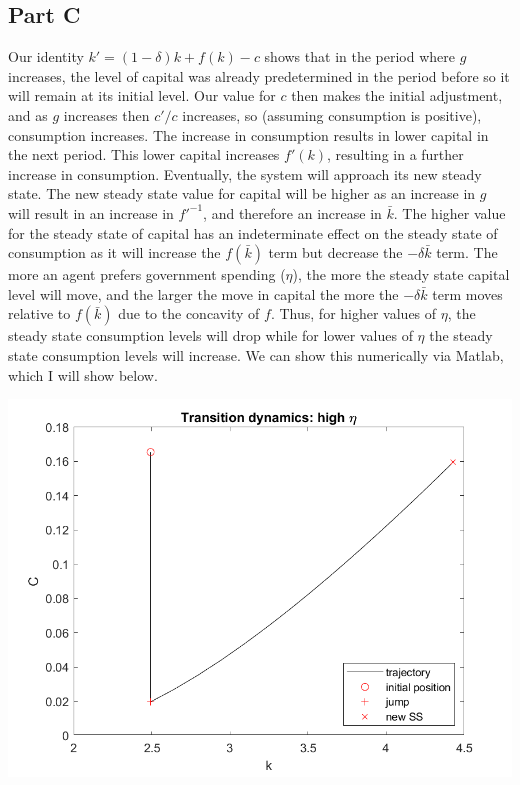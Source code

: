 \documentclass[11pt]{article} %
\begin{document}
\subsection{Part C}
Our identity $k' = (1-\delta)k + f(k) - c$ shows that in the period where $g$ increases, the level of capital was already predetermined in the period before so it will remain at its initial level. Our value for $c$ then makes the initial adjustment, and as $g$ increases then $c'/c$ increases, so (assuming consumption is positive), consumption increases. The increase in consumption results in lower capital in the next period. This lower capital increases $f'(k)$, resulting in a further increase in consumption. Eventually, the system will approach its new steady state. The new steady state value for capital will be higher as an increase in $g$ will result in an increase in $f'^{-1}$, and therefore an increase in $\bar{k}.$ The higher value for the steady state of capital has an indeterminate effect on the steady state of consumption as it will increase the $f(\bar{k})$ term but decrease the $-\delta \bar{k}$ term. The more an agent prefers government spending ($\eta$), the more the steady state capital level will move, and the larger the move in capital the more the $-\delta \bar{k}$ term moves relative to $f(\bar{k})$ due to the concavity of $f$. Thus, for higher values of $\eta$, the steady state consumption levels will drop while for lower values of $\eta$ the steady state consumption levels will increase. We can show this numerically via Matlab, which I will show below.

\includegraphics{higheta}
\end{document}
